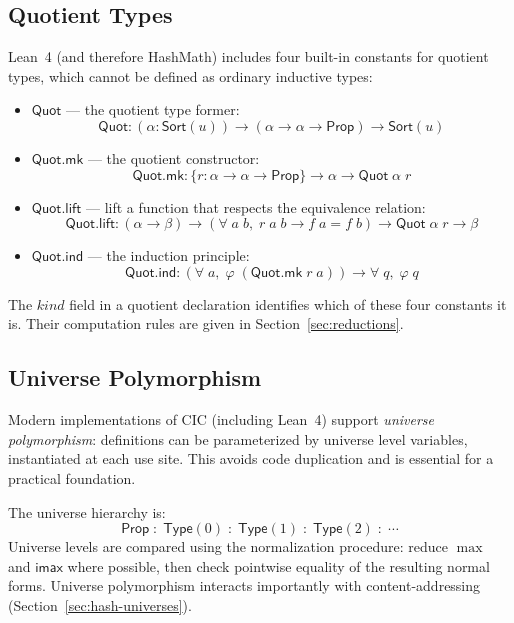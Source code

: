 \documentclass[11pt]{article}
\theoremstyle{definition}
\theoremstyle{plain}
\theoremstyle{remark}
\newcommand{\Sort}{\textsf{Sort}}
\newcommand{\Prop}{\textsf{Prop}}
\newcommand{\Type}{\textsf{Type}}
\newcommand{\Quot}{\textsf{Quot}}
\begin{document}
\subsection{Quotient Types}
\label{sec:quotient}

Lean~4 (and therefore HashMath) includes four built-in constants for quotient types, which
cannot be defined as ordinary inductive types:

\begin{itemize}[nosep]
  \item $\Quot$ --- the quotient type former:
    \[ \Quot : (\alpha : \Sort(u)) \to (\alpha \to \alpha \to \Prop) \to \Sort(u) \]

  \item $\Quot.\textsf{mk}$ --- the quotient constructor:
    \[ \Quot.\textsf{mk} : \{r : \alpha \to \alpha \to \Prop\} \to \alpha \to \Quot\;\alpha\;r \]

  \item $\Quot.\textsf{lift}$ --- lift a function that respects the equivalence relation:
    \[ \Quot.\textsf{lift} : (\alpha \to \beta) \to (\forall\;a\;b,\; r\;a\;b \to f\;a = f\;b) \to \Quot\;\alpha\;r \to \beta \]

  \item $\Quot.\textsf{ind}$ --- the induction principle:
    \[ \Quot.\textsf{ind} : (\forall\;a,\; \varphi\;(\Quot.\textsf{mk}\;r\;a)) \to \forall\;q,\; \varphi\;q \]
\end{itemize}

The $\mathit{kind}$ field in a quotient declaration identifies which of these four constants it is.
Their computation rules are given in Section~\ref{sec:reductions}.

\subsection{Universe Polymorphism}
\label{sec:universes}

Modern implementations of CIC (including Lean~4) support \emph{universe polymorphism}:
definitions can be parameterized by universe level variables, instantiated at each use site.
This avoids code duplication and is essential for a practical foundation.

The universe hierarchy is:
\[
  \Prop \;:\; \Type(0) \;:\; \Type(1) \;:\; \Type(2) \;:\; \cdots
\]
Universe levels are compared using the normalization procedure: reduce $\max$ and $\textsf{imax}$
where possible, then check pointwise equality of the resulting normal forms.
Universe polymorphism interacts importantly with content-addressing (Section~\ref{sec:hash-universes}).
\end{document}
